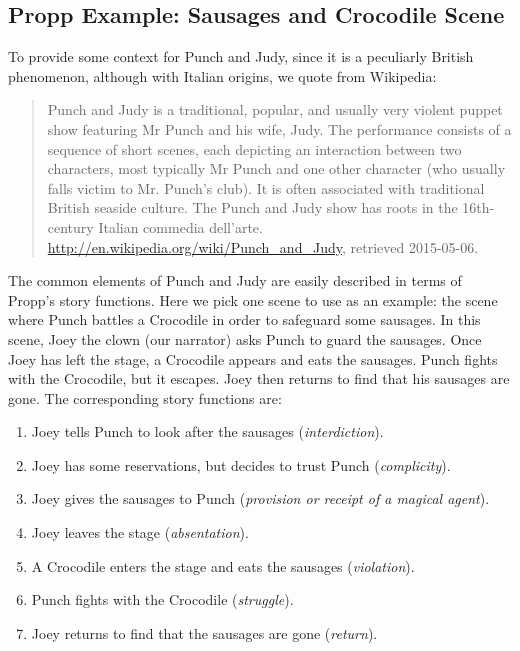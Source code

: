 \documentclass{llncs}
\begin{document}
\subsection{Propp Example: Sausages and Crocodile Scene}\label{sec:pjexample}
To provide some context for Punch and Judy, since it is a peculiarly British phenomenon, although with Italian origins, we quote from Wikipedia:
\begin{quote}\small
Punch and Judy is a traditional, popular, and usually very violent puppet show featuring Mr Punch and his wife, Judy. The performance consists of a sequence of short scenes, each depicting an interaction between two characters, most typically Mr Punch and one other character (who usually falls victim to Mr. Punch's club). It is often associated with traditional British seaside culture.
The Punch and Judy show has roots in the 16th-century Italian commedia dell'arte. \\
\hfill{\footnotesize
\url{http://en.wikipedia.org/wiki/Punch_and_Judy}, retrieved 2015-05-06.}
\end{quote}

The common elements of Punch and Judy are easily described in terms of Propp's story functions. Here we pick one scene to use as an example: the scene where Punch battles a Crocodile in order to safeguard some sausages.  In this scene, Joey the clown (our narrator) asks Punch to guard the sausages. Once Joey has left the stage, a Crocodile appears and eats the sausages. Punch fights with the Crocodile, but it escapes. Joey then returns to find that his sausages are gone.
The corresponding story functions are:
\begin{enumerate}
  \item Joey tells Punch to look after the sausages (\emph{interdiction}).
  \item Joey has some reservations, but decides to trust Punch (\emph{complicity}).
  \item Joey gives the sausages to Punch (\emph{provision or receipt of a magical agent}).
  \item Joey leaves the stage (\emph{absentation}).
  \item A Crocodile enters the stage and eats the sausages (\emph{violation}).
  \item Punch fights with the Crocodile (\emph{struggle}).
  \item Joey returns to find that the sausages are gone (\emph{return}).
\end{enumerate}
\end{document}

